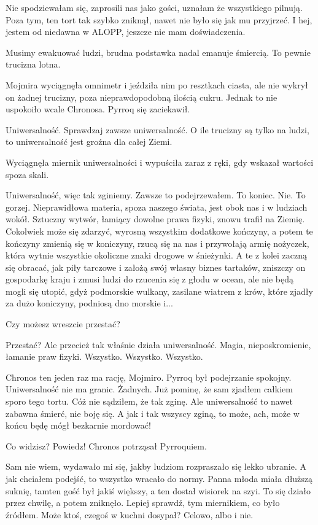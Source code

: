 \ds{} Nie spodziewałam się, zaprosili nas jako gości, uznałam że wszystkiego pilnują. Poza tym, ten tort tak szybko zniknął, nawet nie było się jak mu przyjrzeć. 
I hej, jestem od niedawna w ALOPP, jeszcze nie mam doświadczenia. \de{}

\ds{} Musimy ewakuować ludzi, brudna podstawka nadal emanuje śmiercią. To pewnie trucizna lotna. \de{}

Mojmira wyciągnęła omnimetr i jeździła nim po resztkach ciasta, ale nie wykrył on żadnej trucizny, poza nieprawdopodobną ilością cukru.
Jednak to nie uspokoiło wcale Chronosa. Pyrroq się zaciekawił.

\ds{} Uniwersalność. Sprawdzaj zawsze uniwersalność. O ile trucizny są tylko na ludzi, to uniwersalność jest groźna dla całej Ziemi. \de{}

Wyciągnęła miernik uniwersalności i wypuściła zaraz z ręki, gdy wskazał wartości spoza skali.

\ds{} Uniwersalność, więc tak zginiemy. Zawsze to podejrzewałem. To koniec. Nie. To gorzej. Nieprawidłowa materia, spoza naszego świata, jest obok nas i w ludziach wokół.
Sztuczny wytwór, łamiący dowolne prawa fizyki, znowu trafił na Ziemię.
Cokolwiek może się zdarzyć, wyrosną wszystkim dodatkowe kończyny, a potem te kończyny zmienią się w koniczyny, rzucą się na nas i przywołają armię nożyczek, która wytnie wszystkie okoliczne znaki drogowe w śnieżynki. 
A te z kolei zaczną się obracać, jak piły tarczowe i założą swój własny biznes tartaków, zniszczy on gospodarkę kraju i zmusi ludzi do rzucenia się z głodu w ocean, ale nie będą mogli się
utopić, gdyż podmorskie wulkany, zasilane wiatrem z krów, które zjadły za dużo koniczyny, podniosą dno morskie i... \de{}

\ds{} Czy możesz wreszcie przestać? \de{}

\ds{} Przestać? Ale przecież tak właśnie działa uniwersalność. Magia, nieposkromienie, łamanie praw fizyki. Wszystko. Wszystko. Wszystko. \de{}

\ds{} Chronos ten jeden raz ma rację, Mojmiro. \dm{} Pyrroq był podejrzanie spokojny. \dm{} Uniwersalność nie ma granic. Żadnych. 
Już pominę, że sam zjadłem całkiem sporo tego tortu. Cóż nie sądziłem, że tak zginę. Ale uniwersalność to nawet zabawna śmierć, nie boję się. 
A jak i tak wszyscy zginą, to może, ach, może w końcu będę mógł bezkarnie mordować! \de{}

\ds{} Co widzisz? Powiedz! \dm{} Chronos potrząsał Pyrroquiem. \de{}

\ds{} Sam nie wiem, wydawało mi się, jakby ludziom rozpraszało się lekko ubranie. A jak chciałem podejść, to wszystko wracało do normy.
Panna młoda miała dłuższą suknię, tamten gość był jakiś większy, a ten dostał wisiorek na szyi. To się działo przez chwilę, a potem zniknęło.
Lepiej sprawdź, tym miernikiem, co było źródłem. Może ktoś, czegoś w kuchni dosypał? Celowo, albo i nie. \de{}

